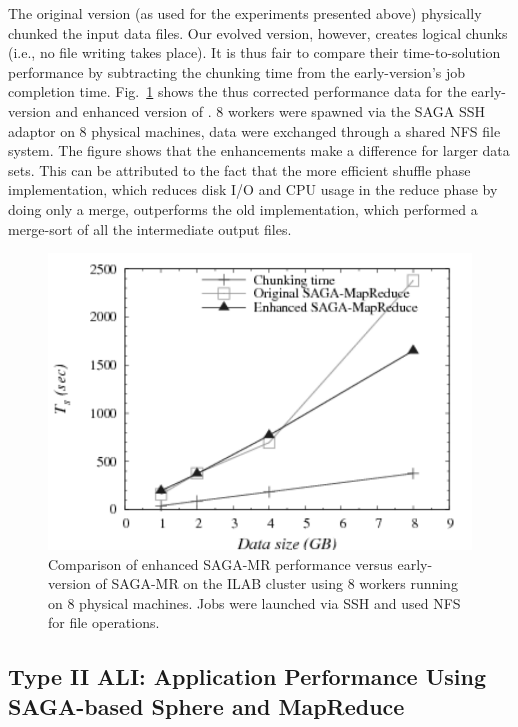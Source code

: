 \documentclass[graybox]{svmult}
\begin{document}
The original \sagamapreduce version (as used for the experiments
presented above) physically chunked the input data files.  Our evolved
version, however, creates logical chunks (i.e., no file
writing takes place).  It is thus fair to compare their
time-to-solution performance by subtracting the chunking time from the
early-version's job completion time.  Fig.~\ref{fig:sagamr_comparison}
shows the thus corrected performance data for the early-version and
enhanced version of \sagamapreduce.  8 workers were spawned via the
SAGA SSH adaptor on 8 physical machines,  data were exchanged through
a shared NFS file system.  The figure shows that the \sagamapreduce
enhancements make a difference for larger data sets.  This can be
attributed to the fact that the more efficient shuffle phase
implementation, which reduces disk I/O and CPU usage in the reduce
phase by doing only a merge, outperforms the old implementation, which
performed a merge-sort of all the intermediate output files.

\begin{figure}[htb!]
 \includegraphics[width=1.0\textwidth]{figures/sagamr_comparison-gray.pdf}
 \caption{
   Comparison of enhanced SAGA-MR performance versus
   early-version of SAGA-MR on the ILAB cluster using 8 workers running on 8
   physical machines. Jobs were launched via SSH and used NFS for file
   operations.
   \label{fig:sagamr_comparison}
   }
\end{figure}

\subsection{Type II ALI: Application Performance Using SAGA-based
Sphere and MapReduce}
\end{document}
